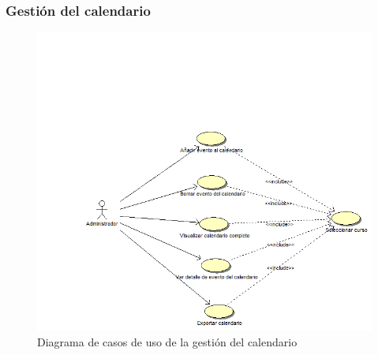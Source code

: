 \documentclass{book}
\begin{document}
\subsubsection{Gestión del calendario}
\begin{figure}[H] 
  \label{gestion-calendario} 
	\begin{center}
    \includegraphics[scale=0.5]{./gestioncalendario.png}
  \end{center}
\caption{Diagrama de casos de uso de la gestión del calendario}
\end{figure}
\end{document}
